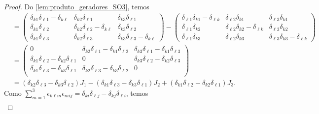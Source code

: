 \begin{proof}
    Do \cref{lem:produto_geradores_SO3}, temos
    \begin{align*}
        [J_k, J_\ell] &= \begin{pmatrix}
            \delta_{k1}\delta_{\ell 1} - \delta_{k\ell} & \delta_{k2} \delta_{\ell 1} & \delta_{k3} \delta_{\ell 1}\\
            \delta_{k1} \delta_{\ell2} & \delta_{k2} \delta_{\ell 2} - \delta_{k \ell} & \delta_{k3} \delta_{\ell 2}\\
            \delta_{k1} \delta_{\ell3} & \delta_{k2} \delta_{\ell 3} & \delta_{k3}\delta_{\ell 3} - \delta_{k\ell}
        \end{pmatrix}
        -
        \begin{pmatrix}
            \delta_{\ell1}\delta_{k 1} - \delta_{\ell k} & \delta_{\ell2} \delta_{k 1} & \delta_{\ell3} \delta_{k 1}\\
            \delta_{\ell1} \delta_{k2} & \delta_{\ell2} \delta_{k 2} - \delta_{\ell k} & \delta_{\ell3} \delta_{k 2}\\
            \delta_{\ell1} \delta_{k3} & \delta_{\ell2} \delta_{k 3} & \delta_{\ell3}\delta_{k 3} - \delta_{\ell k}
        \end{pmatrix}\\
                      &= \begin{pmatrix}
                          0 & \delta_{k2} \delta_{\ell 1} - \delta_{k1} \delta_{\ell2} & \delta_{k3}\delta_{\ell 1} - \delta_{k1}\delta_{\ell 3}\\
                          \delta_{k1}\delta_{\ell 2} - \delta_{k2}\delta_{\ell 1} & 0 & \delta_{k 3}\delta_{\ell 2} - \delta_{k2} \delta_{\ell 3}\\
                          \delta_{k1}\delta_{\ell 3} - \delta_{k 3}\delta_{\ell 1} & \delta_{k2}\delta_{\ell 3} - \delta_{k3} \delta_{\ell 2} & 0\\
                      \end{pmatrix}\\
                      &= (\delta_{k2}\delta_{\ell 3} - \delta_{k3} \delta_{\ell 2}) J_1
                      -(\delta_{k1}\delta_{\ell 3} - \delta_{k3} \delta_{\ell 1}) J_2
                      +(\delta_{k1}\delta_{\ell 2} - \delta_{k2} \delta_{\ell 1}) J_3.
    \end{align*}
    Como \(\sum_{m = 1}^3 \epsilon_{k \ell m } \epsilon_{m i j } = \delta_{k i }\delta_{\ell j} - \delta_{k j}\delta_{\ell i}\), temos
    \begin{align*}

\end{align*}
\end{proof}

